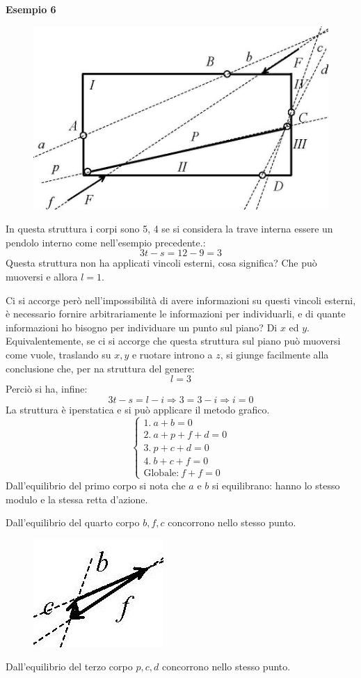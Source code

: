 \documentclass{article}
\begin{document}
\begin{adjustwidth}{2in}{}
\textbf{Esempio 6} \newline
\begin{figure}[H]
	\centering
	\includegraphics[width=0.5\linewidth]{immagini/1.PARTE4_Pagina_35}
\end{figure}
In questa struttura i corpi sono 5, 4 se si considera la trave interna essere un pendolo interno come nell'esempio precedente.:
\[3t - s = 12 - 9 = 3 \]
Questa struttura non ha applicati vincoli esterni, cosa significa? Che può muoversi e allora $l=1$.

Ci si accorge però nell'impossibilità di avere informazioni su questi vincoli esterni, è necessario fornire arbitrariamente le informazioni per individuarli, e di quante informazioni ho bisogno per individuare un punto sul piano? Di $x$ ed $y$. 
Equivalentemente, se ci si accorge che questa struttura sul piano può muoversi come vuole, traslando su $ x, y  $ e ruotare introno a $z$, si giunge facilmente alla conclusione che, per na struttura del genere:
\[ l = 3\]
Perciò si ha, infine: 
\[3t - s = l - i \Rightarrow 3 = 3 - i \Rightarrow i = 0 \]
La struttura è iperstatica e si può applicare il metodo grafico.
\[\begin{cases}
	1. ~ a + b = 0\\
	2. ~ a + p +f + d  = 0 \\
	3. ~ p + c + d = 0 \\
	4. ~ b + c + f = 0 \\
	\text{Globale:} ~ f  + f = 0
\end{cases}\]
Dall'equilibrio del primo corpo si nota che $a$ e $b$ si equilibrano: hanno lo stesso modulo e la stessa retta d'azione. 

Dall'equilibrio del quarto corpo $b,f,c$ concorrono nello stesso punto.

\begin{figure}[H]
	\centering
	\includegraphics[width=0.15\linewidth]{immagini/1.PARTE4_Pagina_35.1}
\end{figure}
\newpage
Dall'equilibrio del terzo corpo $p,c,d$ concorrono nello stesso punto. 


\end{adjustwidth}
\end{document}

